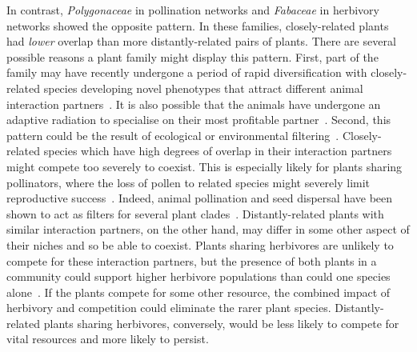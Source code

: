 \documentclass[12pt]{article}
\begin{document}
\begin{spacing}{1.5}
  In contrast, \emph{Polygonaceae} in pollination networks and 
  \emph{Fabaceae} in herbivory networks showed the opposite 
  pattern. In these families, closely-related plants had 
  \emph{lower} overlap than more distantly-related pairs of plants. 
  There are several possible reasons a plant family might
  display this pattern. First, part of the family may have recently 
  undergone a period of rapid diversification with closely-related species 
  developing novel phenotypes that attract different animal 
  interaction partners~\citep{Linder2008,Breitkopf2015}. It is also possible that the
  animals have undergone an adaptive radiation to 
  specialise on their most profitable partner~\citep{Janz2006}. Second, this pattern 
  could be the result of ecological or environmental filtering~\citep{Mayfield2009,Ackerly2010}. 
  Closely-related species which have high degrees of overlap in their interaction 
  partners might compete too severely to coexist. This is especially likely
  for plants sharing pollinators, where the loss of pollen to related species 
  might severely limit reproductive success~\citep{Levin1970,Bell2005,Mitchell2009}.
  Indeed, animal pollination and seed dispersal have been shown to act
  as filters for several plant clades~\citep{Mayfield2009}.
  Distantly-related plants with similar interaction partners,
  on the other hand, may differ in some other aspect of their niches
  and so be able to coexist. Plants sharing herbivores are unlikely to
  compete for these interaction partners, but the presence of both
  plants in a community could support higher herbivore populations
  than could one species alone~\citep{Russell2007}. If the plants 
  compete for some other resource, the combined impact of herbivory
  and competition could eliminate the rarer plant species. Distantly-related
  plants sharing herbivores, conversely, would be less likely to compete
  for vital resources and more likely to persist.



\end{spacing}
\end{document}
